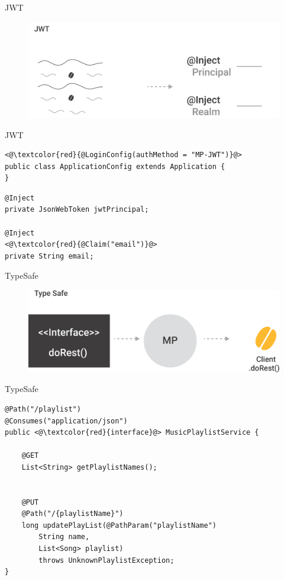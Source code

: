 \documentclass[aspectratio=169]{beamer}
\begin{document}
\begin{frame}{JWT}
\begin{figure}
	\centering
	\includegraphics[width=0.9\linewidth]{Images/jwt}
\end{figure}
\end{frame}


\begin{frame}[fragile]{JWT}

\begin{lstlisting}
<@\textcolor{red}{@LoginConfig(authMethod = "MP-JWT")}@>
public class ApplicationConfig extends Application {
}
\end{lstlisting}

\begin{lstlisting}
@Inject
private JsonWebToken jwtPrincipal;

@Inject
<@\textcolor{red}{@Claim("email")}@>
private String email;
\end{lstlisting}
\end{frame}

\begin{frame}{TypeSafe}
\begin{figure}
	\centering
	\includegraphics[width=0.75\linewidth]{Images/typesafe}
\end{figure}
\end{frame}

\begin{frame}[fragile]{TypeSafe}


\begin{lstlisting}
@Path("/playlist")
@Consumes("application/json")
public <@\textcolor{red}{interface}@> MusicPlaylistService {

	@GET
	List<String> getPlaylistNames();


	@PUT
	@Path("/{playlistName}")
	long updatePlayList(@PathParam("playlistName")
		String name,
		List<Song> playlist)
		throws UnknownPlaylistException;
}
\end{lstlisting}
\end{frame}
\end{document}
